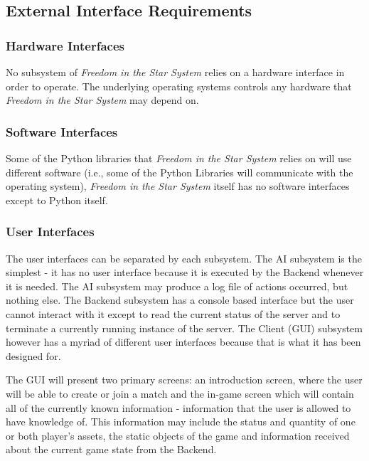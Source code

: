 \documentclass[twoside,letterpaper]{article}
\begin{document}
\subsection{External Interface Requirements}

\subsubsection{Hardware Interfaces}
No subsystem of \textit{Freedom in the Star System} relies on a hardware interface in order to operate.  The underlying operating systems controls any hardware that \textit{Freedom in the Star System} may depend on.

\subsubsection{Software Interfaces}
Some of the Python libraries that \textit{Freedom in the Star System} relies on will use different software (i.e., some of the Python Libraries will communicate with the operating system), \textit{Freedom in the Star System} itself has no software interfaces except to Python itself.

\subsubsection{User Interfaces}
The user interfaces can be separated by each subsystem.  The AI subsystem is the simplest - it has no user interface because it is executed by the Backend whenever it is needed.  The AI subsystem may produce a log file of actions occurred, but nothing else.  The Backend subsystem has a console based interface but the user cannot interact with it except to read the current status of the server and to terminate a currently running instance of the server.  The Client (GUI) subsystem however has a myriad of different user interfaces because that is what it has been designed for.  

The GUI will present two primary screens: an introduction screen, where the user will be able to create or join a match and the in-game screen which will contain all of the currently known information - information that the user is allowed to have knowledge of.  This information may include the status and quantity of one or both player's assets, the static objects of the game and information received about the current game state from the Backend.
\end{document}
